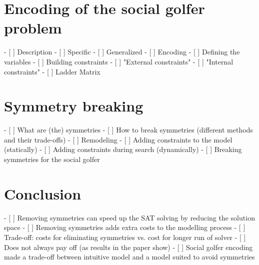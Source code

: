 \documentclass[a4paper]{scrartcl}
\begin{document}
\section{Encoding of the social golfer problem}

- [ ] Description
    - [ ] Specific
    - [ ] Generalized
- [ ] Encoding
    - [ ] Defining the variables
    - [ ] Building constraints
        - [ ] "External constraints"
        - [ ] "Internal constraints"
            - [ ] Ladder Matrix

\section{Symmetry breaking}

- [ ] What are (the) symmetries
- [ ] How to break symmetries (different methods and their trade-offs)
    - [ ] Remodeling
    - [ ] Adding constraints to the model (statically)
    - [ ] Adding constraints during search (dynamically)
- [ ] Breaking symmetries for the social golfer

\section{Conclusion}

- [ ] Removing symmetries can speed up the SAT solving by reducing the
      solution space
- [ ] Removing symmetries adds extra costs to the modelling process
    - [ ] Trade-off: costs for eliminating symmetries vs. cost for
          longer run of solver
    - [ ] Does not always pay off (as results in the paper show)
- [ ] Social golfer encoding made a trade-off between intuitive model
      and a model suited to avoid symmetries
\end{document}
